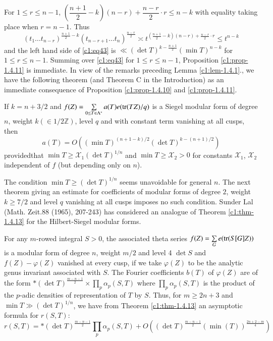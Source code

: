For $1\leq r\leq n-1$, $(\dfrac{n+1}{2}-k)(n-r)+\dfrac{n-r}{2}\cdot
r\leq n-k$ with equality taking place when $r=n-1$. Thus
$$
(t_{1}\ldots t_{n-r})^{\frac{n+1}{2}-k}(t_{n-r+1}\ldots
t_{n})^{\frac{n-r}{2}}\asymp
t^{(\frac{n+1}{2}-k)(n-r)+\frac{n-r}{2}\cdot r}\leq t^{n-k}
$$
and the left hand side of \eqref{c1:eq43} is $\ll (\det
T)^{k-\frac{n+1}{2}}(\min T)^{n-k}$ for $1\leq r\leq n-1$. Summing
over \eqref{c1:eq43} for $1\leq r\leq n-1$, Proposition \ref{c1:prop-1.4.11}
is immediate. In view of the remarks preceding Lemma \ref{c1:lem-1.4.1}.,
we have the following theorem (and Theorem C in the Introduction) as
an immediate consequence of Proposition \ref{c1:prop-1.4.10} and
\ref{c1:prop-1.4.11}.

\setcounter{subtheorem}{12}
\begin{subtheorem}\label{c1:thm-1.4.13}
If $k=n+3/2$ and $f(Z)=\sum\limits_{0\leq
  T\in\Lambda^{\ast}}a(T)\break e(\tr(TZ)/q)$ is a Siegel modular form of
  degree $n$, weight $k(\in 1/2\mathbb{Z})$, level $q$ and with
  constant term vanishing at all cusps, then
$$
a(T)=O((\min T)^{(n+1-k)/2}(\det T)^{k-(n+1)/2})
$$
provided\pageoriginale that $\min T\geq \mathscr{X}_{1}(\det T)^{1/n}$
and $\min T\geq \mathscr{X}_{2}>0$ for constants $\mathscr{X}_{1}$,
$\mathscr{X}_{2}$ independent of $f$ (but depending only on $n$).
\end{subtheorem}

\begin{remarks*}
The condition $\min T\geq (\det T)^{1/n}$ seems unavoidable for
general $n$. The next theorem giving an estimate for coefficients of
modular forms of degree $2$, weight $k\geq 7/2$ and level $q$
vanishing at all cusps imposes no such condition. Sunder Lal (Math.\@
Zeit.\@ 88 (1965), 207-243) has considered an analogue of Theorem
\ref{c1:thm-1.4.13} for the Hilbert-Siegel modular forms.
\end{remarks*}

For any $m$-rowed integral $S>0$, the associated theta series
$f(Z)=\sum\limits_{G}e(\operatorname{tr}(S[G]Z))$ is a modular form of degree $n$,
weight $m/2$ and level 4 $\det S$ and $f(Z)-\varphi(Z)$ vanished at
every cusp, if we take $\varphi(Z)$ to be the analytic genus invariant
associated with $S$. The Fourier coefficients $b(T)$ of $\varphi(Z)$
are of the form $\ast(\det T)^{\frac{m-n-1}{2}}\times
\prod\limits_{p}\alpha_{p}(S,T)$ where
$\prod\limits_{p}\alpha_{p}(S,T)$ is the product of the $p$-adic
densities of representation of $T$ by $S$. Thus, for $m\geq 2n+3$ and
$\min T\gg (\det T)^{1/n}$, we have from Theorem \ref{c1:thm-1.4.13} an
asymptotic formula for $r(S,T)$:
$$
r(S,T)=\ast(\det T)^{\frac{m-n-1}{2}}\prod_{p}\alpha_{p}(S,T)+O\left((\det
T)^{\frac{m-n-1}{2}}(\min (T))^{\frac{2n+2-m}{4}}\right)
$$


